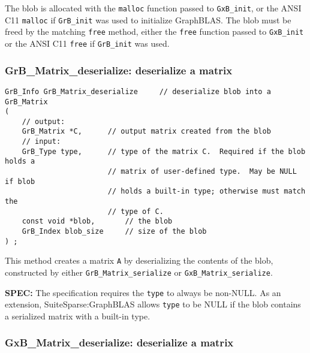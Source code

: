 \documentclass[12pt]{article}
\begin{document}
The blob is allocated with the \verb'malloc' function passed to
\verb'GxB_init', or the ANSI C11 \verb'malloc' if \verb'GrB_init' was used
to initialize GraphBLAS.  The blob must be freed by the matching \verb'free'
method, either the \verb'free' function passed to \verb'GxB_init' or
the ANSI C11 \verb'free' if \verb'GrB_init' was used.

\newpage
\subsubsection{{\sf GrB\_Matrix\_deserialize:}    deserialize a matrix}
\label{matrix_deserialize}

\begin{mdframed}[userdefinedwidth=6in]
{\footnotesize
\begin{verbatim}
GrB_Info GrB_Matrix_deserialize     // deserialize blob into a GrB_Matrix
(
    // output:
    GrB_Matrix *C,      // output matrix created from the blob
    // input:
    GrB_Type type,      // type of the matrix C.  Required if the blob holds a
                        // matrix of user-defined type.  May be NULL if blob
                        // holds a built-in type; otherwise must match the
                        // type of C.
    const void *blob,       // the blob
    GrB_Index blob_size     // size of the blob
) ;
\end{verbatim}
} \end{mdframed}

This method creates a matrix \verb'A' by deserializing the contents of the
blob, constructed by either \verb'GrB_Matrix_serialize' or
\verb'GxB_Matrix_serialize'.

\begin{alert}
{\bf SPEC:} The specification requires the \verb'type' to always be non-NULL.
As an extension, SuiteSparse:GraphBLAS allows \verb'type' to be NULL if
the blob contains a serialized matrix with a built-in type.
\end{alert}

\subsubsection{{\sf GxB\_Matrix\_deserialize:}    deserialize a matrix}
\label{matrix_deserialize_GxB}
\end{document}
